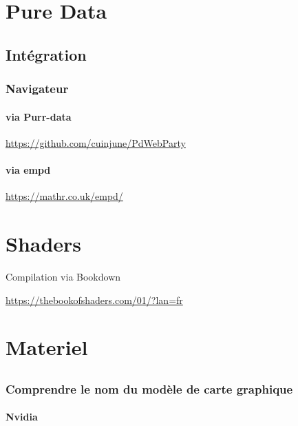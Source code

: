 \documentclass[
  french,
]{book}
\begin{document}
\hypertarget{pure-data}{%
\chapter{Pure Data}\label{pure-data}}

\hypertarget{intuxe9gration}{%
\section{Intégration}\label{intuxe9gration}}

\hypertarget{navigateur-1}{%
\subsection{Navigateur}\label{navigateur-1}}

\hypertarget{via-purr-data}{%
\subsubsection{via Purr-data}\label{via-purr-data}}

\url{https://github.com/cuinjune/PdWebParty}

\hypertarget{via-empd}{%
\subsubsection{via empd}\label{via-empd}}

\url{https://mathr.co.uk/empd/}

\hypertarget{shaders}{%
\chapter{Shaders}\label{shaders}}

Compilation via Bookdown \citep{xie2015}

\url{https://thebookofshaders.com/01/?lan=fr}

\hypertarget{materiel}{%
\chapter{Materiel}\label{materiel}}

\hypertarget{section-6}{%
\section{}\label{section-6}}

\hypertarget{comprendre-le-nom-du-moduxe8le-de-carte-graphique}{%
\subsection{Comprendre le nom du modèle de carte graphique}\label{comprendre-le-nom-du-moduxe8le-de-carte-graphique}}

\hypertarget{nvidia}{%
\subsubsection{Nvidia}\label{nvidia}}

  
\end{document}
